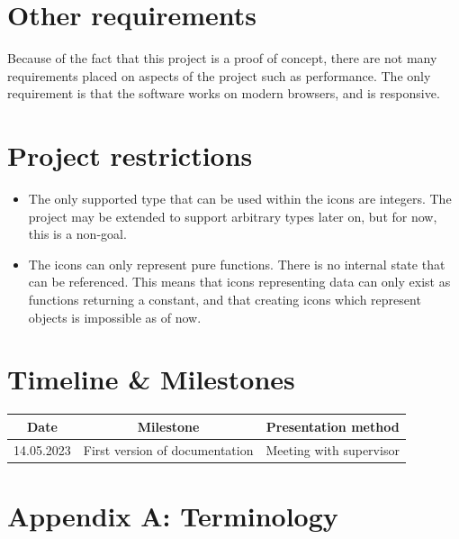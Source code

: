 \documentclass{article}
\begin{document}
    \section{Other requirements}
        Because of the fact that this project is a proof of concept, there are not many requirements placed
        on aspects of the project such as performance. The only requirement is that the software works on modern
        browsers, and is responsive.

    \section{Project restrictions}
        \begin{itemize}

            \item
                The only supported type that can be used within the icons are integers. The project may be extended
                to support arbitrary types later on, but for now, this is a non-goal.

            \item
                The icons can only represent pure functions. There is no internal state that can be referenced. This
                means that icons representing data can only exist as functions returning a constant, and that creating
                icons which represent objects is impossible as of now.

        \end{itemize}


    \section{Timeline \& Milestones}
        \begin{tabular}{ | c | c | c | }
            \hline
            Date & Milestone & Presentation method\\
            \hline

            14.05.2023 & First version of documentation & Meeting with supervisor \\


            \hline

        \end{tabular}



    \section*{Appendix A: Terminology}
\end{document}
